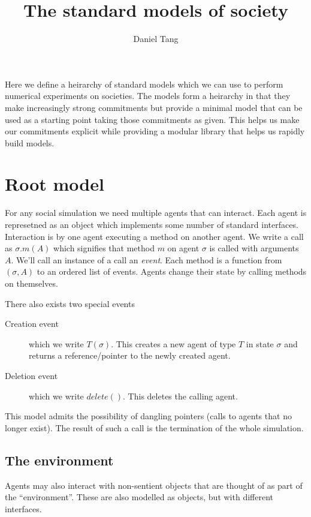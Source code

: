 \documentclass[a4paper]{article}
\title{The standard models of society}
\author{Daniel Tang}
\begin{document}
\maketitle

Here we define a heirarchy of standard models which we can use to perform numerical experiments on societies. The models form a heirarchy in that they make increasingly strong commitments but provide a minimal model that can be used as a starting point taking those commitments as given. This helps us make our commitments explicit while providing a modular library that helps us rapidly build models.

\section{Root model}
For any social simulation we need multiple agents that can interact. Each agent is represetned as an object which implements some number of standard interfaces. Interaction is by one agent executing a method on another agent. We write a call as $\sigma.m(A)$ which signifies that method $m$ on agent $\sigma$ is called with arguments $A$. We'll call an instance of a call an \textit{event}. Each method is a function from $(\sigma,A)$ to an ordered list of events. Agents change their state by calling methods on themselves.

There also exists two special events
\begin{description}
\item[Creation event] which we write $T(\sigma)$. This creates a new agent of type $T$ in state $\sigma$ and returns a reference/pointer to the newly created agent. 

\item[Deletion event] which we write $delete()$. This deletes the calling agent.
	
\end{description}

This model admits the possibility of dangling pointers (calls to agents that no longer exist). The result of such a call is the termination of the whole simulation.

\subsection{The environment}

Agents may also interact with non-sentient objects that are thought of as part of the ``environment''. These are also modelled as objects, but with different interfaces. 
\end{document}
